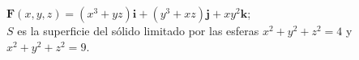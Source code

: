 \item $\mathbf{F}(x, y, z) = (x^3 + yz)\mathbf{i} + (y^3 + xz)\mathbf{j} + xy^2\mathbf{k}$;\\
    $S$ es la superficie del sólido limitado por las esferas $x^2 + y^2 + z^2 = 4$ y $x^2 + y^2 + z^2 = 9$.
